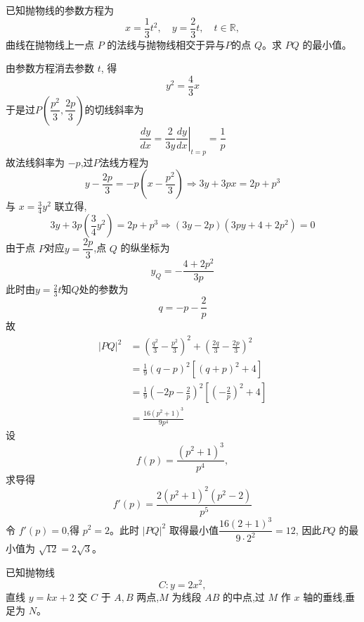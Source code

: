 \begin{questions}
    \question 已知抛物线的参数方程为
    \[
    x=\frac{1}{3}t^2,\quad y=\frac{2}{3}t,\quad t\in\mathbb R,
    \]
    曲线在抛物线上一点 $P$ 的法线与抛物线相交于异与$P$的点 $Q$。求 $PQ$ 的最小值。
    \begin{solution}
        由参数方程消去参数 $t$, 得
        \[
        y^2=\frac{4}{3}x
        \]
        于是过$P\left(\dfrac{p^2}{3}, \dfrac{2p}{3}\right)$的切线斜率为
        \[
        \frac{dy}{dx}=\frac{2}{3y} \left.\frac{dy}{dx}\right|_{t=p}= \frac{1}{p}
        \]
        故法线斜率为 $-p$,过$P$法线方程为
        \[
        y - \frac{2p}{3} = -p\left(x - \frac{p^2}{3}\right) \Rightarrow 3y + 3px = 2p + p^3
        \]
        与 $x = \frac{3}{4}y^2$ 联立得,
        \[
        3y + 3p\left(\frac{3}{4}y^2\right) = 2p + p^3 \Rightarrow (3y - 2p)(3py + 4 + 2p^2) = 0
        \]
        由于点 $P$对应$y = \dfrac{2p}{3}$,点 $Q$ 的纵坐标为
        \[
        y_Q = -\frac{4 + 2p^2}{3p}
        \]
        此时由$y = \frac{2}{3}t$知$Q$处的参数为
        \[
        q = -p - \frac{2}{p}
        \]
        故
        \begin{align*}
        |PQ|^2 &= \left(\frac{q^2}{3} - \frac{p^2}{3}\right)^2 + \left(\frac{2q}{3} - \frac{2p}{3}\right)^2 \\
        &= \frac{1}{9}(q - p)^2 [(q + p)^2 + 4] \\
        &= \frac{1}{9}\left(-2p - \frac{2}{p}\right)^2 \left[\left(-\frac{2}{p}\right)^2 + 4\right] \\
        &= \frac{16(p^2 + 1)^3}{9p^4}
        \end{align*}
        设 
        \[
        f(p) = \frac{(p^2 + 1)^3}{p^4},
        \]
        求导得
        \[
        f'(p) = \frac{2(p^2 + 1)^2(p^2 - 2)}{p^5}
        \]
        令 $f'(p) = 0$,得 $p^2 = 2$。此时 $|PQ|^2$ 取得最小值$\dfrac{16(2 + 1)^3}{9 \cdot 2^2} = 12$, 因此$PQ$ 的最小值为 $\sqrt{12} = 2\sqrt{3}$。
    \end{solution}
    
    \question 已知抛物线
    \[
    C: y=2x^{2},
    \]
    直线 $y=kx+2$ 交 $C$ 于 $A,B$ 两点,$M$ 为线段 $AB$ 的中点,过 $M$ 作 $x$ 轴的垂线,垂足为 $N$。
    \begin{parts}

\end{parts}
\end{questions}
